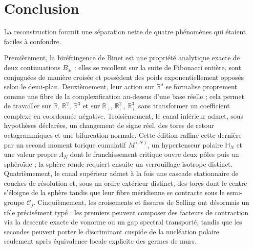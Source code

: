 \documentclass[11pt,a4paper]{article}
\newcommand{\R}{\mathbb R}
\newcommand{\Rp}{\mathbb R_{+}}
\begin{document}
\section{Conclusion}

La reconstruction fournit une séparation nette de quatre phénomènes qui étaient faciles à confondre.

Premièrement, la biréfringence de Binet est une propriété analytique exacte de deux continuations $B_\pm$ : elles se recollent sur la suite de Fibonacci entière, sont conjuguées de manière croisée et possèdent des poids exponentiellement opposés selon le demi-plan. Deuxièmement, leur action sur $\R^d$ se formalise proprement comme une fibre de la complexification au-dessus d'une base réelle ; cela permet de travailler sur $\R$, $\R^2$, $\R^3$ et sur $\Rp$, $\Rp^2$, $\Rp^3$ sans transformer un coefficient complexe en coordonnée négative. Troisièmement, le canal inférieur admet, sous hypothèses déclarées, un changement de signe réel, des tores de retour octagrammiques et une bifurcation normale. Cette édition raffine cette dernière par un second moment torique cumulatif $M^{(N)}$, un hypertenseur polaire $\mathbb H_N$ et une valeur propre $\Lambda_N$ dont le franchissement critique ouvre deux pôles puis un sphéroïde ; la sphère ronde requiert ensuite un verrouillage isotrope distinct. Quatrièmement, le canal supérieur admet à la fois une cascade stationnaire de couches de résolution et, sous un ordre extérieur distinct, des tores dont le centre s'éloigne de la sphère tandis que leur fibre méridienne se contracte sous le semi-groupe $\mathcal C_j$. Cinquièmement, les croisements et fissures de Selling ont désormais un rôle précisément typé : les premiers peuvent composer des facteurs de contraction via la descente exacte de vonorme ou un gap spectral transporté, tandis que les secondes peuvent porter le discriminant cuspide de la nucléation polaire seulement après équivalence locale explicite des germes de murs.
\end{document}
